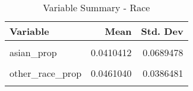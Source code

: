\begin{table}[H]

\caption{\label{tab:tab:race}Variable Summary - Race}
\centering
\begin{tabular}[t]{lrr}
\toprule
Variable & Mean & Std. Dev\\
\midrule
\cellcolor{gray!6}{american\_indian\_prop} & \cellcolor{gray!6}{0.0209390} & \cellcolor{gray!6}{0.0444245}\\
asian\_prop & 0.0410412 & 0.0689478\\
\cellcolor{gray!6}{black\_prop} & \cellcolor{gray!6}{0.0916388} & \cellcolor{gray!6}{0.0958481}\\
other\_race\_prop & 0.0461040 & 0.0386481\\
\cellcolor{gray!6}{white\_prop} & \cellcolor{gray!6}{0.8002770} & \cellcolor{gray!6}{0.1325927}\\
\bottomrule
\end{tabular}
\end{table}
